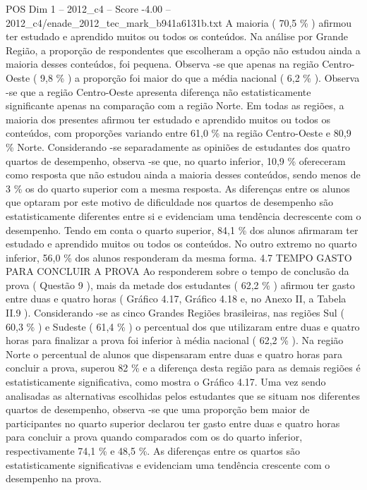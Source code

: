 \begin{textsample}{POS Dim 1 – 2012\_c4 – Score -4.00 – 2012\_c4/enade\_2012\_tec\_mark\_b941a6131b.txt}
A maioria ( 70,5 \% ) afirmou ter estudado e aprendido muitos ou todos os conteúdos.
Na análise por Grande Região, a proporção de respondentes que escolheram a opção não estudou ainda a maioria desses conteúdos, foi pequena.
Observa -se que apenas na região Centro-Oeste ( 9,8 \% ) a proporção foi maior do que a média nacional ( 6,2 \% ).
Observa -se que a região Centro-Oeste apresenta diferença não estatisticamente significante apenas na comparação com a região Norte.
Em todas as regiões, a maioria dos presentes afirmou ter estudado e aprendido muitos ou todos os conteúdos, com proporções variando entre 61,0 \% na região Centro-Oeste e 80,9 \% Norte.
Considerando -se separadamente as opiniões de estudantes dos quatro quartos de desempenho, observa -se que, no quarto inferior, 10,9 \% ofereceram como resposta que não estudou ainda a maioria desses conteúdos, sendo menos de 3 \% os do quarto superior com a mesma resposta.
As diferenças entre os alunos que optaram por este motivo de dificuldade nos quartos de desempenho são estatisticamente diferentes entre si e evidenciam uma tendência decrescente com o desempenho.
Tendo em conta o quarto superior, 84,1 \% dos alunos afirmaram ter estudado e aprendido muitos ou todos os conteúdos.
No outro extremo no quarto inferior, 56,0 \% dos alunos responderam da mesma forma. 4.7 TEMPO GASTO PARA CONCLUIR A PROVA Ao responderem sobre o tempo de conclusão da prova ( Questão 9 ), mais da metade dos estudantes ( 62,2 \% ) afirmou ter gasto entre duas e quatro horas ( Gráfico 4.17, Gráfico 4.18 e, no Anexo II, a Tabela II.9 ).
Considerando -se as cinco Grandes Regiões brasileiras, nas regiões Sul ( 60,3 \% ) e Sudeste ( 61,4 \% ) o percentual dos que utilizaram entre duas e quatro horas para finalizar a prova foi inferior à média nacional ( 62,2 \% ).
Na região Norte o percentual de alunos que dispensaram entre duas e quatro horas para concluir a prova, superou 82 \% e a diferença desta região para as demais regiões é estatisticamente significativa, como mostra o Gráfico 4.17.
Uma vez sendo analisadas as alternativas escolhidas pelos estudantes que se situam nos diferentes quartos de desempenho, observa -se que uma proporção bem maior de participantes no quarto superior declarou ter gasto entre duas e quatro horas para concluir a prova quando comparados com os do quarto inferior, respectivamente 74,1 \% e 48,5 \%.
As diferenças entre os quartos são estatisticamente significativas e evidenciam uma tendência crescente com o desempenho na prova.

\end{textsample}
